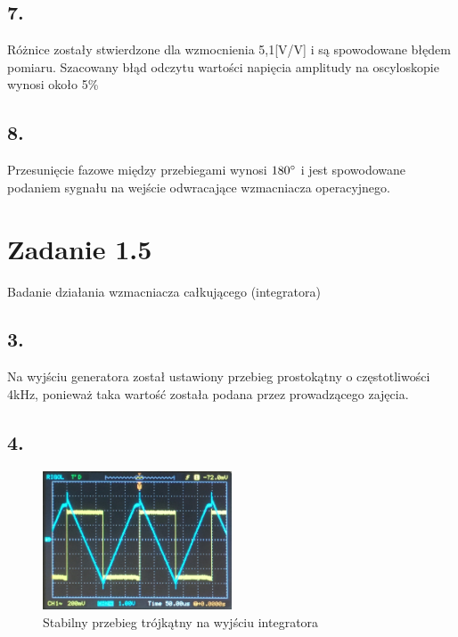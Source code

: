 \documentclass[polish,a4paper]{article}
\begin{document}
\subsection*{7.}
Różnice zostały stwierdzone dla wzmocnienia 5,1[V/V] i są spowodowane błędem pomiaru. Szacowany błąd odczytu wartości napięcia amplitudy na oscyloskopie wynosi około 5\%%
\subsection*{8.}
Przesunięcie fazowe między przebiegami wynosi $180\degree$ i jest spowodowane podaniem sygnału na wejście odwracające wzmacniacza operacyjnego.


\section{Zadanie 1.5}
Badanie działania wzmacniacza całkującego (integratora)
\subsection*{3.}
Na wyjściu generatora został ustawiony przebieg prostokątny o częstotliwości 4kHz, ponieważ taka wartość została podana przez prowadzącego zajęcia.
\subsection*{4.}
\begin{figure}[!h]
\centering
\includegraphics[width=0.5\textwidth]{przebieg_trojkatny}
\caption{Stabilny przebieg trójkątny na wyjściu integratora}
\end{figure}
\end{document}

